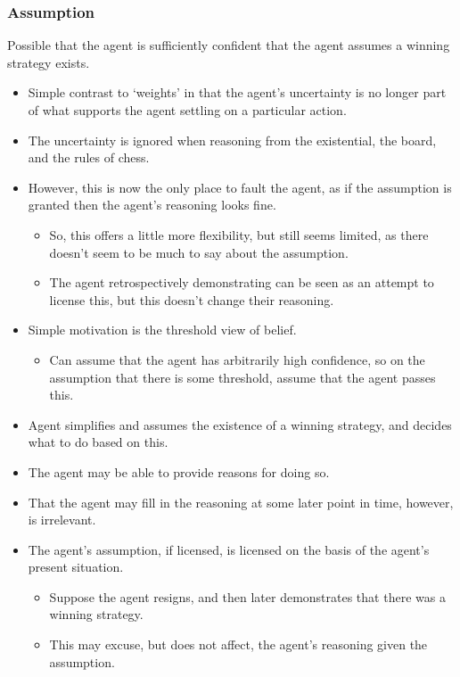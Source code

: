 \documentclass[10pt]{article}
\begin{document}
\subsubsection{Assumption}
\label{sec:assumption}

\begin{note}
  Possible that the agent is sufficiently confident that the agent assumes a winning strategy exists.
  \begin{itemize}
  \item Simple contrast to `weights' in that the agent's uncertainty is no longer part of what supports the agent settling on a particular action.
  \item The uncertainty is ignored when reasoning from the existential, the board, and the rules of chess.
  \item However, this is now the only place to fault the agent, as if the assumption is granted then the agent's reasoning looks fine.
    \begin{itemize}
    \item So, this offers a little more flexibility, but still seems limited, as there doesn't seem to be much to say about the assumption.
    \item The agent retrospectively demonstrating can be seen as an attempt to license this, but this doesn't change their reasoning.
    \end{itemize}
  \end{itemize}
\end{note}

\begin{itemize}
\item Simple motivation is the threshold view of belief.
  \begin{itemize}
  \item Can assume that the agent has arbitrarily high confidence, so on the assumption that there is some threshold, assume that the agent passes this.
  \end{itemize}
\item Agent simplifies and assumes the existence of a winning strategy, and decides what to do based on this.
\item The agent may be able to provide reasons for doing so.
\item That the agent may fill in the reasoning at some later point in time, however, is irrelevant.
\item The agent's assumption, if licensed, is licensed on the basis of the agent's present situation.
  \begin{itemize}
  \item Suppose the agent resigns, and then later demonstrates that there was a winning strategy.
  \item This may excuse, but does not affect, the agent's reasoning given the assumption.
  \end{itemize}
\end{itemize}
\end{document}
